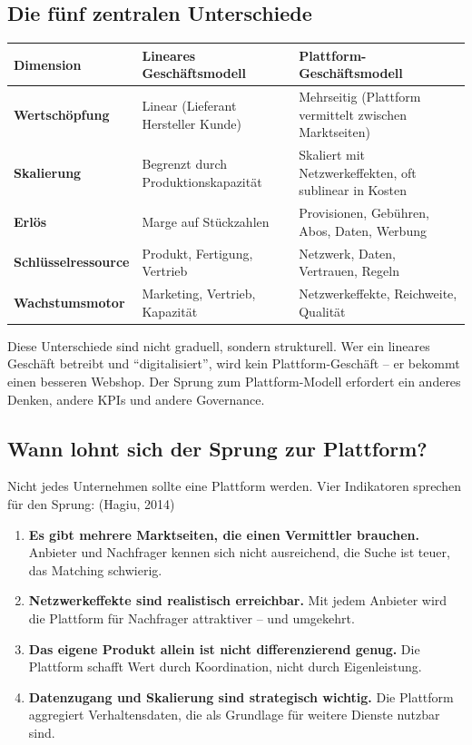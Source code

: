 \documentclass[11pt,a4paper,oneside]{article}
\newcommand{\fachbegriff}[1]{\textbf{#1}}
\newcommand{\quelle}[1]{{\footnotesize\color{lpGray}(#1)}}
\begin{document}
\subsection{Die fünf zentralen Unterschiede}

\begin{tabularx}{\linewidth}{@{}>{\bfseries}lXX@{}}
\toprule
Dimension & Lineares Geschäftsmodell & Plattform-Geschäftsmodell \\
\midrule
Wertschöpfung   & Linear (Lieferant \textrightarrow{} Hersteller \textrightarrow{} Kunde) & Mehrseitig (Plattform vermittelt zwischen Marktseiten) \\
Skalierung       & Begrenzt durch Produktionskapazität & Skaliert mit Netzwerkeffekten, oft sublinear in Kosten \\
Erlös            & Marge auf Stückzahlen                & Provisionen, Gebühren, Abos, Daten, Werbung \\
Schlüssel\-ressource & Produkt, Fertigung, Vertrieb         & Netzwerk, Daten, Vertrauen, Regeln \\
Wachstumsmotor & Marketing, Vertrieb, Kapazität       & Netzwerkeffekte, Reichweite, Qualität \\
\bottomrule
\end{tabularx}

\medskip

\noindent Diese Unterschiede sind nicht graduell, sondern strukturell. Wer ein lineares Geschäft betreibt und ``digitalisiert'', wird kein Plattform-Geschäft -- er bekommt einen besseren Webshop. Der Sprung zum Plattform-Modell erfordert ein anderes Denken, andere KPIs und andere Governance.

\subsection{Wann lohnt sich der Sprung zur Plattform?}

Nicht jedes Unternehmen sollte eine Plattform werden. Vier Indikatoren sprechen für den Sprung: \quelle{Hagiu, 2014}

\begin{enumerate}
  \item \fachbegriff{Es gibt mehrere Marktseiten, die einen Vermittler brauchen.} Anbieter und Nachfrager kennen sich nicht ausreichend, die Suche ist teuer, das Matching schwierig.
  \item \fachbegriff{Netzwerkeffekte sind realistisch erreichbar.} Mit jedem Anbieter wird die Plattform für Nachfrager attraktiver -- und umgekehrt.
  \item \fachbegriff{Das eigene Produkt allein ist nicht differenzierend genug.} Die Plattform schafft Wert durch Koordination, nicht durch Eigenleistung.
  \item \fachbegriff{Datenzugang und Skalierung sind strategisch wichtig.} Die Plattform aggregiert Verhaltensdaten, die als Grundlage für weitere Dienste nutzbar sind.
\end{enumerate}
\end{document}
